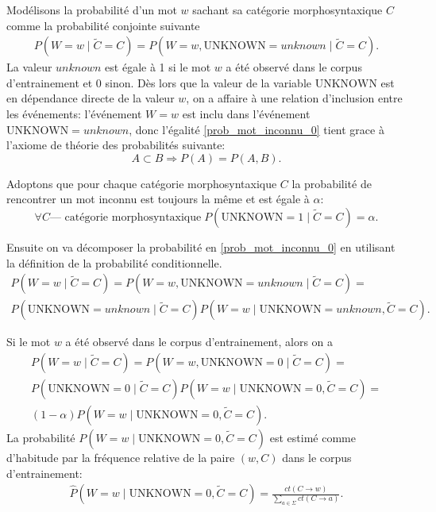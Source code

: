 \documentclass[12pt]{article}
\begin{document}
Mod\'elisons la probabilit\'e d'un mot $w$ sachant sa cat\'egorie morphosyntaxique $C$ comme la probabilit\'e conjointe suivante
\begin{eqnarray}
\label{prob_mot_inconnu_0}
 P(W = w \mid \tilde{C} = C) = P(W = w, \mathrm{UNKNOWN} = unknown \mid \tilde{C} = C).
\end{eqnarray}
La valeur $unknown$ est \'egale \`a 1 si le mot $w$ a \'et\'e observ\'e dans le corpus d'entrainement et 0 sinon. D\`es lors que la valeur de la variable $\mathrm{UNKNOWN}$ est en d\'ependance directe de la valeur $w$,
on a affaire \`a une relation d'inclusion entre les \'ev\'enements: l'\'ev\'enement $W = w$ est inclu dans l'\'ev\'enement $\mathrm{UNKNOWN} = unknown$, donc l'\'egalit\'e \ref{prob_mot_inconnu_0} tient grace \`a l'axiome de th\'eorie des probabilit\'es suivante:
$$ A \subset B \Rightarrow P(A) = P(A,B).$$

Adoptons que pour chaque cat\'egorie morphosyntaxique $C$ la probabilit\'e de rencontrer un mot inconnu est toujours la m\^eme et est \'egale \`a $\alpha$:
$$ \forall C \text{--- cat\'egorie morphosyntaxique} \; P(\mathrm{UNKNOWN} = 1 \mid \tilde{C} = C) = \alpha.$$

Ensuite on va d\'ecomposer la probabilit\'e en \ref{prob_mot_inconnu_0} en utilisant la d\'efinition de la probabilit\'e conditionnelle.
\begin{multline}
\label{prob_mot_inconnu_cond}
 P(W = w \mid \tilde{C} = C) = P(W = w, \mathrm{UNKNOWN} = unknown \mid \tilde{C} = C) = 
 \\
 P(\mathrm{UNKNOWN} = unknown \mid \tilde{C} = C) P(W = w \mid \mathrm{UNKNOWN} = unknown , \tilde{C} = C).
\end{multline}

 Si le mot $w$ a \'et\'e observ\'e dans le corpus d'entrainement, alors on a
\begin{multline}
\label{prob_mot_connu_1}
 P(W = w \mid \tilde{C} = C) = P(W = w, \mathrm{UNKNOWN} = 0 \mid \tilde{C} = C) = 
 \\
 P(\mathrm{UNKNOWN} = 0 \mid \tilde{C} = C) P(W = w \mid \mathrm{UNKNOWN} = 0, \tilde{C} = C) =
 \\
 (1 - \alpha) P(W = w \mid \mathrm{UNKNOWN} = 0, \tilde{C} = C).
\end{multline}
La probabilit\'e $P(W = w \mid \mathrm{UNKNOWN} = 0, \tilde{C} = C)$ est estim\'e 
comme d'habitude par la fr\'equence relative de la paire $(w, C)$ dans le corpus d'entrainement:
\begin{eqnarray*}
\hat{P}(W = w \mid \mathrm{UNKNOWN} = 0, \tilde{C} = C) =
\frac{ct(C \rightarrow w)}{\sum\limits_{a \in \Sigma}{ct(C \rightarrow a)}}.
\end{eqnarray*}
\end{document}

